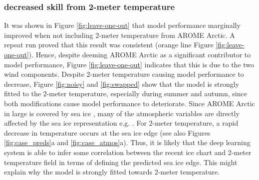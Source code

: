 \documentclass[../main/thesis]{subfiles}
\begin{document}
\subsubsection{decreased skill from 2-meter temperature}
\label{sec:discuss_seggrad_t2m}
It was shown in Figure \ref{fig:leave-one-out} that model performance marginally improved when not including 2-meter temperature from AROME Arctic. A repeat run proved that this result was consistent (orange line Figure \ref{fig:leave-one-out}). Hence, despite deeming AROME Arctic as a significant contributor to model performance, Figure \ref{fig:leave-one-out} indicates that this is due to the two wind components. Despite 2-meter temperature causing model performance to decrease, Figure \ref{fig:noisy} and \ref{fig:swapped} show that the model is strongly fitted to the 2-meter temperature, especially during summer and autumn, since both modifications cause model performance to deteriorate. Since AROME Arctic in large is covered by sea ice \citep{Mueller2017}, many of the atmospheric variables are directly affected by the sea ice representation e.g. \citep{Mueller2017, Batrak2018, Batrak2019, Mueller2023}. For 2-meter temperature, a rapid decrease in temperature occurs at the sea ice edge \citep{Mueller2023} (see also Figures \ref{fig:case_preds}a and \ref{fig:case_atmos}a). Thus, it is likely that the deep learning system is able to infer some correlation between the recent ice chart and 2-meter temperature field in terms of defining the predicted sea ice edge. This might explain why the model is strongly fitted towards 2-meter temperature. 
\end{document}
